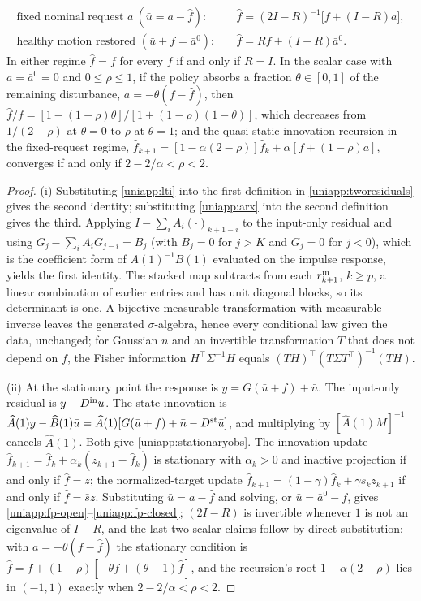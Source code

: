 \begin{proposition}
\begin{enumerate}[leftmargin=1.5em,itemsep=1pt,label=(\roman*)]
\begin{align}
 \text{fixed nominal request }a\ (\bar u=a-\hat f):\quad&
 \hat f=(2I-R)^{-1}\big[f+(I-R)a\big],\label{uniapp:fp-open}\\
 \text{healthy motion restored }(\bar u+f=\bar a^0):\quad&
 \hat f=Rf+(I-R)\bar a^0.\label{uniapp:fp-closed}
\end{align}
In either regime $\hat f=f$ for every $f$ if and only if $R=I$. In the scalar
case with $a=\bar a^0=0$ and $0\le\rho\le1$, if the policy absorbs a fraction
$\theta\in[0,1]$ of the remaining disturbance, $a=-\theta(f-\hat f)$, then
$\hat f/f=[1-(1-\rho)\theta]/[1+(1-\rho)(1-\theta)]$, which decreases from
$1/(2-\rho)$ at $\theta=0$ to $\rho$ at $\theta=1$; and the quasi-static
innovation recursion in the fixed-request regime,
$\hat f_{k+1}=[1-\alpha(2-\rho)]\hat f_k+\alpha[f+(1-\rho)a]$, converges if
and only if $2-2/\alpha<\rho<2$.
\end{enumerate}
\end{proposition}
\begin{proof}
(i) Substituting \eqref{uniapp:lti} into the first definition in
\eqref{uniapp:tworesiduals} gives the second identity; substituting
\eqref{uniapp:arx} into the second definition gives the third. Applying
$I-\sum_iA_i(\cdot)_{k+1-i}$ to the input-only residual and using
$G_j-\sum_iA_iG_{j-i}=B_j$ (with $B_j=0$ for $j>K$ and $G_{j}=0$ for $j<0$),
which is the coefficient form of $A(1)^{-1}B(1)$ evaluated on the impulse
response, yields the first identity. The stacked map subtracts from each
$r^{\rm in}_{k+1}$, $k\ge p$, a linear combination of earlier entries and has
unit diagonal blocks, so its determinant is one. A bijective measurable
transformation with measurable inverse leaves the generated $\sigma$-algebra,
hence every conditional law given the data, unchanged; for Gaussian $n$ and an
invertible transformation $T$ that does not depend on $f$, the Fisher
information $H^\top\Sigma^{-1}H$ equals $(TH)^\top(T\Sigma T^\top)^{-1}(TH)$.

(ii) At the stationary point the response is $y=G(\bar u+f)+\bar n$. The
input-only residual is $y-D^{\rm in}\bar u$. The state innovation is
$\widehat A(1)y-\widehat B(1)\bar u=\widehat A(1)[G(\bar u+f)+\bar n-D^{\rm st}\bar u]$,
and multiplying by $[\widehat A(1)M]^{-1}$ cancels $\widehat A(1)$. Both
give \eqref{uniapp:stationaryobs}. The innovation update
$\hat f_{k+1}=\hat f_k+\alpha_k(z_{k+1}-\hat f_k)$ is stationary with
$\alpha_k>0$ and inactive projection if and only if $\hat f=z$; the
normalized-target update
$\hat f_{k+1}=(1-\gamma)\hat f_k+\gamma s_kz_{k+1}$ if and only if
$\hat f=\bar sz$. Substituting $\bar u=a-\hat f$ and solving, or
$\bar u=\bar a^0-f$, gives \eqref{uniapp:fp-open}--\eqref{uniapp:fp-closed};
$(2I-R)$ is invertible whenever $1$ is not an eigenvalue of $I-R$, and the
last two scalar claims follow by direct substitution: with
$a=-\theta(f-\hat f)$ the stationary condition is
$\hat f=f+(1-\rho)[-\theta f+(\theta-1)\hat f]$, and the recursion's root
$1-\alpha(2-\rho)$ lies in $(-1,1)$ exactly when $2-2/\alpha<\rho<2$.
\end{proof}


